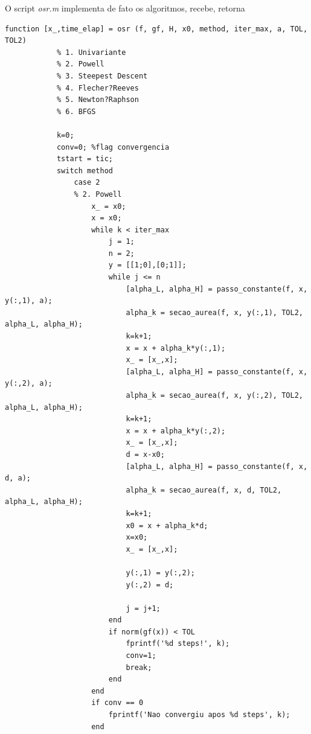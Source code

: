 \documentclass[10pt, a4paper]{article}
\begin{document}
O script \textit{osr.m} implementa de fato os algoritmos, recebe, retorna

\begin{minipage}{\linewidth}
      \begin{lstlisting}[style=myStyle, caption=script osr.m implementando o m\'etodo de Powell, label=list_osr]
            function [x_,time_elap] = osr (f, gf, H, x0, method, iter_max, a, TOL, TOL2)
            % 1. Univariante
            % 2. Powell
            % 3. Steepest Descent
            % 4. Flecher?Reeves
            % 5. Newton?Raphson
            % 6. BFGS

            k=0;
            conv=0; %flag convergencia
            tstart = tic;
            switch method
                case 2
                % 2. Powell
                    x_ = x0;
                    x = x0;
                    while k < iter_max
                        j = 1;
                        n = 2;
                        y = [[1;0],[0;1]];
                        while j <= n
                            [alpha_L, alpha_H] = passo_constante(f, x, y(:,1), a);
                            alpha_k = secao_aurea(f, x, y(:,1), TOL2, alpha_L, alpha_H);
                            k=k+1;
                            x = x + alpha_k*y(:,1);
                            x_ = [x_,x];
                            [alpha_L, alpha_H] = passo_constante(f, x, y(:,2), a);
                            alpha_k = secao_aurea(f, x, y(:,2), TOL2, alpha_L, alpha_H);
                            k=k+1;
                            x = x + alpha_k*y(:,2);
                            x_ = [x_,x];
                            d = x-x0;
                            [alpha_L, alpha_H] = passo_constante(f, x, d, a);
                            alpha_k = secao_aurea(f, x, d, TOL2, alpha_L, alpha_H);
                            k=k+1;
                            x0 = x + alpha_k*d;
                            x=x0;
                            x_ = [x_,x];

                            y(:,1) = y(:,2);
                            y(:,2) = d;

                            j = j+1;
                        end
                        if norm(gf(x)) < TOL
                            fprintf('%d steps!', k);
                            conv=1;
                            break;
                        end
                    end
                    if conv == 0
                        fprintf('Nao convergiu apos %d steps', k);
                    end
      \end{lstlisting}
\end{minipage}
\end{document}
